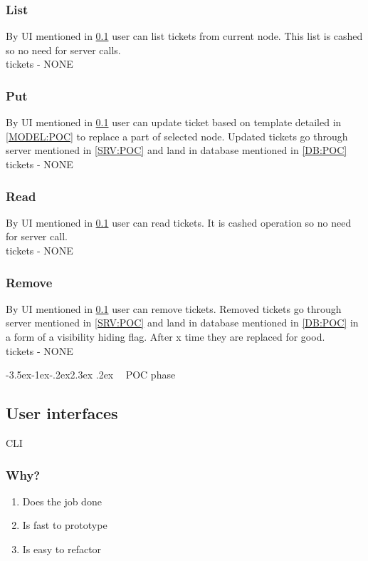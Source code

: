 \documentclass[12pt,a4paper,twoside]{article}
\makeatletter
\def\section{\@startsection{section}{1}{\z@ }%
  {-3.5ex\@plus -1ex\@minus -.2ex}{2.3ex \@plus .2ex}%
  {\noindent\normalfont \Large \bfseries \ }%
}
\makeatother
\begin{document}
\subsubsection{List}
By UI mentioned in \ref{UI:POC} user can list tickets from current node. This list is cashed so no need for server calls.\\
tickets - NONE
\subsubsection{Put}
By UI mentioned in \ref{UI:POC} user can update ticket based on template detailed in \ref{MODEL:POC} 
to replace a part of selected node. Updated tickets go through server mentioned in \ref{SRV:POC} and land in database mentioned in \ref{DB:POC}\\
tickets - NONE
\subsubsection{Read}
By UI mentioned in \ref{UI:POC} user can read tickets. It is cashed operation so no need for server call.\\
tickets - NONE
\subsubsection{Remove}
By UI mentioned in \ref{UI:POC} user can remove tickets. Removed tickets go through server mentioned in \ref{SRV:POC} and land in database mentioned in \ref{DB:POC} in a form of a visibility hiding flag. After x time they are replaced for good.\\
tickets - NONE



\newpage
\section{POC phase}
\subsection{User interfaces}\label{UI:POC}
CLI
\subsubsection{Why?}
\begin{enumerate}
    \item Does the job done
    \item Is fast to prototype
    \item Is easy to refactor
\end{enumerate}
\end{document}
